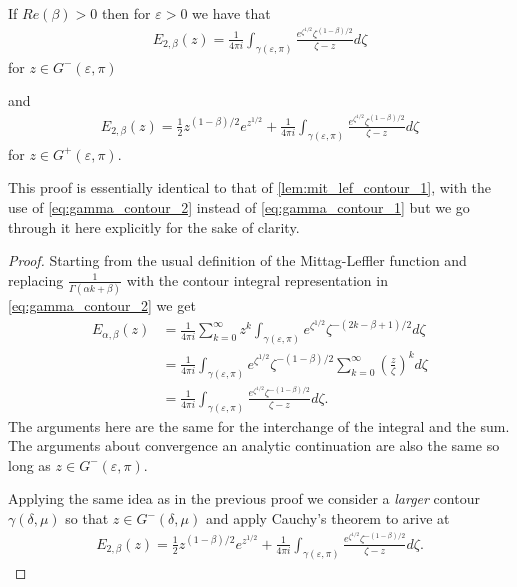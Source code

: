\begin{lemma}
    If $ Re(\beta) > 0 $ then for $ \varepsilon > 0 $ we have that
    \begin{align}
        E_{2,\beta}(z) = \frac{1}{4\pi i} \int_{\gamma(\varepsilon, \pi)} \frac{e^{\zeta^{1/2}}\zeta^{(1-\beta) / 2}}{\zeta - z}d \zeta
    \end{align}
    for $ z \in G^-(\varepsilon, \pi) $ 

and
    \begin{align}
        E_{2,\beta}(z) = \frac{1}{2} z^{(1-\beta)/2} e^{z^{1/2}} + \frac{1}{4\pi i} \int_{\gamma(\varepsilon, \pi)} \frac{e^{\zeta^{1/2}}\zeta^{(1-\beta) / 2}}{\zeta - z}d \zeta
    \end{align}
    for $ z \in G^+(\varepsilon, \pi) $.
\end{lemma}
This proof is essentially identical to that of \ref{lem:mit_lef_contour_1}, with the use of \eqref{eq:gamma_contour_2} instead of \eqref{eq:gamma_contour_1} but we go through it here explicitly for the sake of clarity. 
\begin{proof}
    Starting from the usual definition of the Mittag-Leffler function and replacing $ \frac{1}{\Gamma(\alpha k + \beta)} $ with the
    contour integral representation in \eqref{eq:gamma_contour_2} we get
    \begin{align}
        E_{\alpha, \beta}(z) &= \frac{1}{4\pi i} \sum_{k=0}^\infty z^k \int_{\gamma(\varepsilon, \pi)} e^{\zeta^{1/2}} \zeta^{-(2k-\beta + 1)/2} d\zeta \\
        &= \frac{1}{4 \pi i} \int_{\gamma(\varepsilon, \pi)} e^{\zeta^{1/2}} \zeta^{-(1-\beta)/2} \sum_{k=0}^\infty \left( \frac{z}{\zeta} \right)^k d\zeta \\
        &= \frac{1}{4\pi i} \int_{\gamma(\varepsilon, \pi)} \frac{e^{\zeta^{1/2}} \zeta^{-(1-\beta)/2}}{\zeta - z} d\zeta.
    \end{align}
    The arguments here are the same for the interchange of the integral and the sum. The arguments about convergence an analytic continuation are also the same so long as $ z \in G^-(\varepsilon, \pi) $. 

    Applying the same idea as in the previous proof we consider a \emph{larger} contour $ \gamma(\delta, \mu) $ so that $ z \in G^-(\delta, \mu) $ and apply Cauchy's theorem to arive at
    \begin{align*}
        E_{2,\beta}(z) = \frac{1}{2} z^{(1-\beta)/2} e^{z^{1/2}} +  \frac{1}{4\pi i} \int_{\gamma(\varepsilon, \pi)} \frac{e^{\zeta^{1/2}} \zeta^{-(1-\beta)/2}}{\zeta - z} d\zeta.
    \end{align*}
\end{proof}
